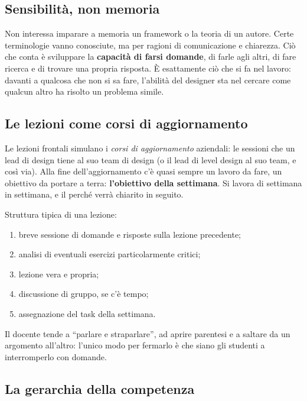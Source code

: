 \subsection{Sensibilità, non memoria}

Non interessa imparare a memoria un framework o la teoria di un autore. Certe
terminologie vanno conosciute, ma per ragioni di comunicazione e chiarezza.
Ciò che conta è sviluppare la \textbf{capacità di farsi domande}, di farle
agli altri, di fare ricerca e di trovare una propria risposta. È esattamente
ciò che si fa nel lavoro: davanti a qualcosa che non si sa fare, l'abilità
del designer sta nel cercare come qualcun altro ha risolto un problema simile.

\subsection{Le lezioni come corsi di aggiornamento}

Le lezioni frontali simulano i \emph{corsi di aggiornamento} aziendali: le
sessioni che un lead di design tiene al suo team di design (o il lead di
level design al suo team, e così via). Alla fine dell'aggiornamento c'è quasi
sempre un lavoro da fare, un obiettivo da portare a terra:
\textbf{l'obiettivo della settimana}. Si lavora di settimana in settimana, e
il perché verrà chiarito in seguito.

Struttura tipica di una lezione:
\begin{enumerate}
  \item breve sessione di domande e risposte sulla lezione precedente;
  \item analisi di eventuali esercizi particolarmente critici;
  \item lezione vera e propria;
  \item discussione di gruppo, se c'è tempo;
  \item assegnazione del task della settimana.
\end{enumerate}
Il docente tende a ``parlare e straparlare'', ad aprire parentesi e a saltare
da un argomento all'altro: l'unico modo per fermarlo è che siano gli studenti
a interromperlo con domande.

\subsection{La gerarchia della competenza}



